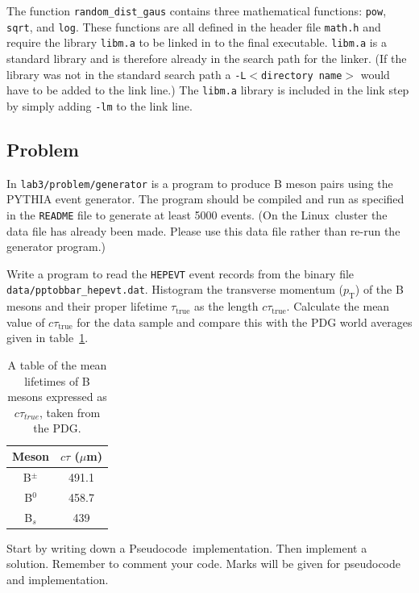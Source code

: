 \documentclass[11pt]{scrartcl}
\def\psc{Pseudocode}
\def\linux{Linux}
\begin{document}
The function \texttt{random\_dist\_gaus} contains three mathematical
functions: \texttt{pow}, \texttt{sqrt}, and \texttt{log}.  These
functions are all defined in the header file \texttt{math.h} and
require the library \texttt{libm.a} to be linked in to the final
executable.   \texttt{libm.a} is a standard library and is therefore
already in the search path for the linker.  (If the library was not in
the standard search path a \texttt{-L$<$directory name$>$} would have
to be added to the link line.)  The \texttt{libm.a} library is
included in the link step by simply adding \texttt{-lm} to the link line.

\clearpage
\newpage

\subsection{Problem}
In \texttt{lab3/problem/generator} is a program to produce B meson pairs
using the PYTHIA\cite{pythia} event generator.  The program should be
compiled and run as specified in the \texttt{README} file to generate
at least 5000 events.  (On the \linux\ cluster the data file has already
been made.  Please use this data file rather than re-run the generator
program.)

Write a program to read the \texttt{HEPEVT} event records from the
binary file\\ \texttt{data/pptobbar\_hepevt.dat}.  Histogram the
transverse momentum ($p_\mathrm{T}$) of the B mesons and their proper lifetime
$\tau_\mathrm{true}$ as the length $c\tau_\mathrm{true}$.  Calculate the mean value
of $c\tau_\mathrm{true}$ for the data sample and compare this with
the PDG\cite{pdg} world averages given in table~\ref{table:lifetimes}.

\begin{table}[h!!]
\begin{center}
\begin{tabular}{|c|c|}\hline \hline
Meson & $c\tau$ ($\mu$m) \\ \hline
B$^\pm$ & 491.1 \\
B$^0$ & 458.7 \\ 
B$_s$ & 439 \\ \hline \hline
\end{tabular}
\end{center}
\caption{A table of the mean lifetimes of B mesons expressed as
$c\tau_{true}$, taken from the PDG.
\label{table:lifetimes}}  
\end{table}

Start by writing down a \psc\ implementation.  Then implement a
solution.  Remember to comment your code.  Marks will be given for
pseudocode and implementation.
\end{document}
